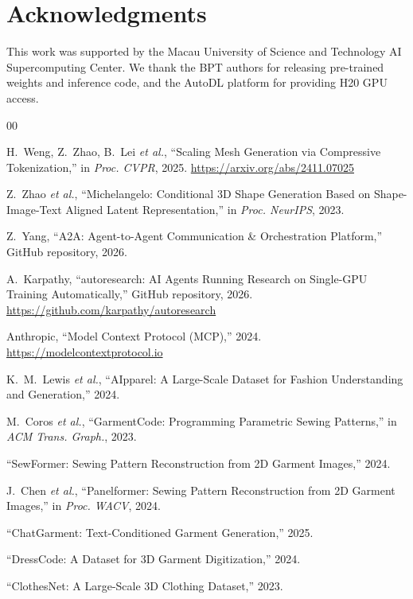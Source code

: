\documentclass[conference]{IEEEtran}
\begin{document}
\section*{Acknowledgments}

This work was supported by the Macau University of Science and Technology AI Supercomputing Center.
We thank the BPT authors for releasing pre-trained weights and inference code, and the AutoDL platform for providing H20 GPU access.


\begin{thebibliography}{00}

H.~Weng, Z.~Zhao, B.~Lei \emph{et al.}, ``Scaling Mesh Generation via Compressive Tokenization,'' in \emph{Proc. CVPR}, 2025.
\url{https://arxiv.org/abs/2411.07025}

Z.~Zhao \emph{et al.}, ``Michelangelo: Conditional 3D Shape Generation Based on Shape-Image-Text Aligned Latent Representation,'' in \emph{Proc. NeurIPS}, 2023.

Z.~Yang, ``A2A: Agent-to-Agent Communication \& Orchestration Platform,'' GitHub repository, 2026.

A.~Karpathy, ``autoresearch: AI Agents Running Research on Single-GPU Training Automatically,'' GitHub repository, 2026.
\url{https://github.com/karpathy/autoresearch}

Anthropic, ``Model Context Protocol (MCP),'' 2024.
\url{https://modelcontextprotocol.io}

K.~M.~Lewis \emph{et al.}, ``AIpparel: A Large-Scale Dataset for Fashion Understanding and Generation,'' 2024.

M.~Coros \emph{et al.}, ``GarmentCode: Programming Parametric Sewing Patterns,'' in \emph{ACM Trans. Graph.}, 2023.

``SewFormer: Sewing Pattern Reconstruction from 2D Garment Images,'' 2024.

J.~Chen \emph{et al.}, ``Panelformer: Sewing Pattern Reconstruction from 2D Garment Images,'' in \emph{Proc. WACV}, 2024.

``ChatGarment: Text-Conditioned Garment Generation,'' 2025.

``DressCode: A Dataset for 3D Garment Digitization,'' 2024.

``ClothesNet: A Large-Scale 3D Clothing Dataset,'' 2023.

\end{thebibliography}
\end{document}
